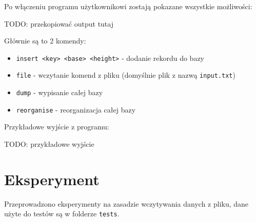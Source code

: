 \documentclass[
]{article}
\providecommand{\tightlist}{%
  \setlength{\itemsep}{0pt}\setlength{\parskip}{0pt}}
\begin{document}
Po włączeniu programu użytkownikowi zostają pokazane wszystkie
możliwości:

TODO: przekopiować output tutaj

Głównie są to 2 komendy:

\begin{itemize}
\tightlist
\item
  \texttt{insert\ \textless{}key\textgreater{}\ \textless{}base\textgreater{}\ \textless{}height\textgreater{}}
  - dodanie rekordu do bazy
\item
  \texttt{file} - wczytanie komend z pliku (domyślnie plik z nazwą
  \texttt{input.txt})
\item
  \texttt{dump} - wypisanie całej bazy
\item
  \texttt{reorganise} - reorganizacja całej bazy
\end{itemize}

Przykładowe wyjście z programu:

TODO: przykładowe wyjście

\section{Eksperyment}\label{eksperyment}

Przeprowadzono eksperymenty na zasadzie wczytywania danych z pliku, dane
użyte do testów są w folderze \texttt{tests}.
\end{document}
